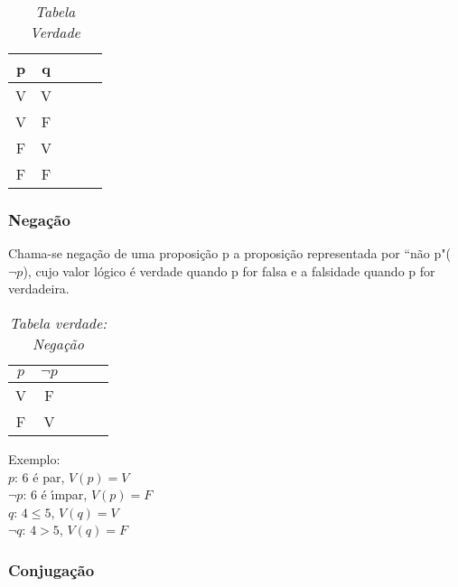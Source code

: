 \begin{table}[h]
   \centering 
   \setlength{\arrayrulewidth}{0,5\arrayrulewidth}
   \caption{\it Tabela Verdade}
   \begin{tabular}{|c|c|c|c|c|} 
      \hline
      p & q \\
      \hline
      V & V \\
      \hline
      V & F\\
      \hline
      F & V \\
      \hline
      F & F \\
      \hline
   \end{tabular}
\label{tabelavdd}
\end{table}

\subsubsection{Nega{\c c}{\~a}o}
\begin{definicao}[Nega{\c c}{\~a}o] Chama-se nega{\c c}{\~a}o de uma proposi{\c c}{\~a}o p a proposi{\c c}{\~a}o representada por ``n{\~a}o p"($\neg p$), cujo valor l{\'o}gico {\'e} verdade quando p for falsa e a falsidade quando p for verdadeira.\end{definicao}
\begin{table}[h]
   \centering 
   \setlength{\arrayrulewidth}{0,5\arrayrulewidth}
   \caption{\it Tabela verdade: Nega{\c c}{\~a}o}
   \begin{tabular}{|c|c|c|c|c|} 
      \hline
     $ p$ & $\neg p$ \\
      \hline
      V & F \\
      \hline
      F & V \\
      \hline
   \end{tabular}
\end{table}

Exemplo:\\
\textbf{$p$}: 6 {\'e} par, $V(p)=V$\\
\textbf{$\neg p$}: 6 {\'e} {\'\i}mpar, $V(p)=F$\\
\textbf{$q$}: $4\leq 5$, $V(q)=V$\\
\textbf{$\neg q$}: $4>5$, $V(q)=F$

\subsubsection{Conjuga{\c c}{\~a}o}

